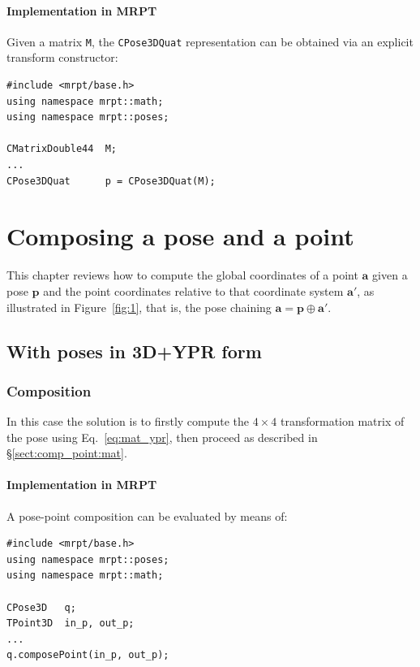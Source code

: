 \documentclass[a4paper,11pt]{report}
\begin{document}
 
\subsubsection{Implementation in MRPT}

Given a matrix \texttt{M}, the \texttt{CPose3DQuat} representation can be obtained via
an explicit transform constructor:

\begin{lstlisting}
#include <mrpt/base.h> 
using namespace mrpt::math; 
using namespace mrpt::poses; 

CMatrixDouble44  M;
...
CPose3DQuat      p = CPose3DQuat(M);
\end{lstlisting}





\chapter{Composing a pose and a point}
\label{ch:comp_pose_pt}

This chapter reviews how to compute the global coordinates of a point $\mathbf{a}$
given a pose $\mathbf{p}$ and the point coordinates relative to that coordinate system $\mathbf{a'}$,
as illustrated in Figure~\ref{fig:1}, that is, the pose chaining $\mathbf{a} = \mathbf{p} \oplus \mathbf{a'}$.

\section{With poses in 3D+YPR form}

\subsection{Composition}

In this case the solution is to firstly compute the $4 \times 4$ 
transformation matrix of the pose using Eq.~\ref{eq:mat_ypr}, then proceed 
as described in \S \ref{sect:comp_point:mat}.


\subsubsection{Implementation in MRPT}

A pose-point composition can be evaluated by means of:

\begin{lstlisting}
#include <mrpt/base.h> 
using namespace mrpt::poses; 
using namespace mrpt::math; 

CPose3D   q;
TPoint3D  in_p, out_p;
...
q.composePoint(in_p, out_p);
\end{lstlisting}
\end{document}
